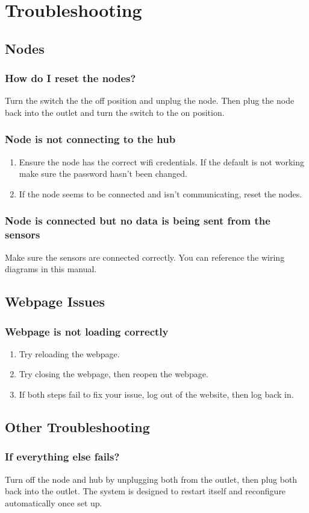   \section{Troubleshooting}
  \subsection{Nodes}
  \subsubsection{How do I reset the nodes?}
    \item Turn the switch the the off position and unplug the node. Then plug the node back into the outlet
  and turn the switch to the on position.
  \subsubsection{Node is not connecting to the hub}
  \begin{enumerate}
    \item Ensure the node has the correct wifi credentials. If the default is not
    working make sure the password hasn't been changed.
    \item If the node seems to be connected and isn't communicating, reset the nodes.
  \end{enumerate}
  \subsubsection{Node is connected but no data is being sent from the sensors}
    \item   Make sure the sensors are connected correctly. You can reference the wiring diagrams
     in this manual.

  \subsection{Webpage Issues}
  \subsubsection{Webpage is not loading correctly}
  \begin{enumerate}
    \item Try reloading the webpage.
    \item Try closing the webpage, then reopen the webpage.
    \item If both steps fail to fix your issue, log out of the website, then log back in.
  \end{enumerate}

  \subsection{Other Troubleshooting}
  \subsubsection{If everything else fails?}
    \item Turn off the node and hub by unplugging both from the outlet, then plug both back into the outlet. The system
     is designed to restart itself and reconfigure automatically once set up.
